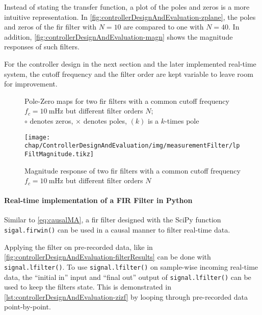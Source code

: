 Instead of stating the transfer function, a plot of the poles and zeros is a more intuitive representation. In \autoref{fig:controllerDesignAndEvaluation-zplane}, the poles and zeros of the \gls{fir} filter with $N=10$ are compared to one with $N=40$. In addition, \autoref{fig:controllerDesignAndEvaluation-magn} shows the magnitude responses of such filters.

For the controller design in the next section and the later implemented real-time system, the cutoff frequency and the filter order are kept variable to leave room for improvement.

\begin{figure}[tb]
    \centering
        \subfloat[$N=10$]{}
        \qquad
        \subfloat[$N=40$]{}
       \caption{Pole-Zero maps for two \gls{fir} filters with a common cutoff frequency $f_c=\SI{10}{\milli\hertz}$ but different filter orders $N$;\\ $\circ$ denotes zeros, $\times$ denotes poles, $(k)$ is a $k$-times pole}
    \label{fig:controllerDesignAndEvaluation-zplane}
\end{figure}

\begin{figure}[tb]
	\centering
	\texttt{[image: chap/ControllerDesignAndEvaluation/img/measurementFilter/lpFiltMagnitude.tikz]}
	\caption{Magnitude response of two \gls{fir} filters with a common cutoff frequency $f_c=\SI{10}{\milli\hertz}$ but different filter orders $N$}
	\label{fig:controllerDesignAndEvaluation-magn}
\end{figure}

\FloatBarrier
\paragraph{Real-time implementation of a FIR Filter in Python}
Similar to \autoref{eq:causalMA}, a \gls{fir} filter designed with the SciPy function \texttt{sigal.firwin()} can be used in a causal manner to filter real-time data.

Applying the filter on pre-recorded data, like in \autoref{fig:controllerDesignAndEvaluation-filterResults} can be done with \texttt{signal.lfilter()}. To use \texttt{signal.lfilter()} on sample-wise incoming real-time data, the ``initial in'' input and ``final out'' output of \texttt{signal.lfilter()} can be used to keep the filters state. This is demonstrated in \autoref{lst:controllerDesignAndEvaluation-zizf} by looping through pre-recorded data point-by-point.

